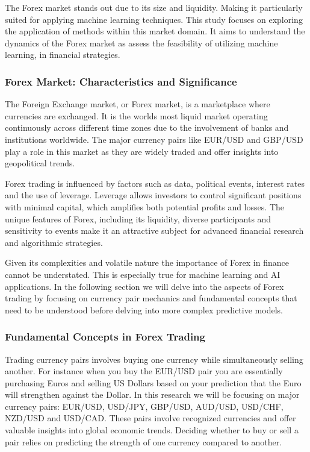 The Forex market stands out due to its size and liquidity. Making it particularly suited for applying machine learning techniques. This study focuses on exploring the application of methods within this market domain. It aims to understand the dynamics of the Forex market as assess the feasibility of utilizing machine learning, in financial strategies.

\subsubsection{Forex Market: Characteristics and Significance}
The Foreign Exchange market, or Forex market, is a marketplace where currencies are exchanged. It is the worlds most liquid market operating continuously across different time zones due to the involvement of banks and institutions worldwide. The major currency pairs like EUR/USD and GBP/USD play a role in this market as they are widely traded and offer insights into geopolitical trends.

Forex trading is influenced by factors such as data, political events, interest rates and the use of leverage. Leverage allows investors to control significant positions with minimal capital, which amplifies both potential profits and losses. The unique features of Forex, including its liquidity, diverse participants and sensitivity to events make it an attractive subject for advanced financial research and algorithmic strategies.

Given its complexities and volatile nature the importance of Forex in finance cannot be understated. This is especially true for machine learning and AI applications. In the following section we will delve into the aspects of Forex trading by focusing on currency pair mechanics and fundamental concepts that need to be understood before delving into more complex predictive models.

\subsubsection{Fundamental Concepts in Forex Trading}
Trading currency pairs involves buying one currency while simultaneously selling another. For instance when you buy the EUR/USD pair you are essentially purchasing Euros and selling US Dollars based on your prediction that the Euro will strengthen against the Dollar. In this research we will be focusing on major currency pairs: EUR/USD, USD/JPY, GBP/USD, AUD/USD, USD/CHF, NZD/USD and USD/CAD. These pairs involve recognized currencies and offer valuable insights into global economic trends. Deciding whether to buy or sell a pair relies on predicting the strength of one currency compared to another.

